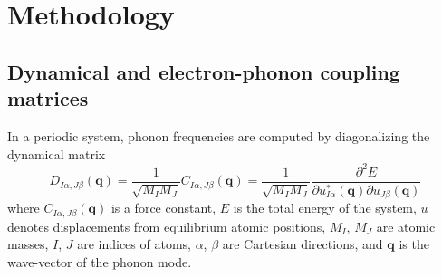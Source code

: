 \documentclass[journal=jctcce,manuscript=article]{achemso}
\begin{document}

\section{Methodology}\label{sec:method}
\subsection{Dynamical and electron-phonon coupling matrices}
In a periodic system, phonon frequencies are computed by diagonalizing the dynamical matrix\cite{baroni2001phonons}
\begin{equation}
    D_{I\alpha,J\beta}(\mathbf{q}) = \frac{1}{\sqrt{M_IM_J}}C_{I\alpha,J\beta}(\mathbf{q}) = \frac{1}{\sqrt{M_IM_J}}\frac{\partial^2E}{\partial u_{I\alpha}^*(\mathbf{q})\partial u_{J\beta}(\mathbf{q})}
\end{equation}
where $C_{I\alpha,J\beta}(\mathbf{q})$ is a force constant, $E$ is the total energy of the system, $u$ denotes displacements from equilibrium atomic positions, $M_I$, $M_J$ are atomic masses, $I$, $J$ are indices of atoms, $\alpha$, $\beta$ are Cartesian directions, and $\mathbf{q}$ is the wave-vector of the phonon mode.
\end{document}
